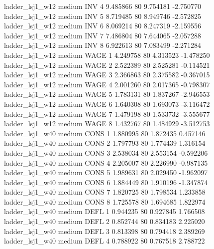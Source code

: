     ladder_lsj1_w12     medium      INV                 4  9.485866 80       9.754181          -2.750770
    ladder_lsj1_w12     medium      INV                 5  8.719485 80       8.949746          -2.572825
    ladder_lsj1_w12     medium      INV                 6  8.069214 80       8.247319          -2.159556
    ladder_lsj1_w12     medium      INV                 7  7.486804 80       7.644065          -2.057288
    ladder_lsj1_w12     medium      INV                 8  6.922613 80       7.083499          -2.271284
    ladder_lsj1_w12     medium     WAGE                 1  4.249758 80       4.313523          -1.478250
    ladder_lsj1_w12     medium     WAGE                 2  2.522389 80       2.525281          -0.114521
    ladder_lsj1_w12     medium     WAGE                 3  2.366863 80       2.375582          -0.367015
    ladder_lsj1_w12     medium     WAGE                 4  2.001260 80       2.017365          -0.798307
    ladder_lsj1_w12     medium     WAGE                 5  1.783131 80       1.837267          -2.946553
    ladder_lsj1_w12     medium     WAGE                 6  1.640308 80       1.693073          -3.116472
    ladder_lsj1_w12     medium     WAGE                 7  1.479198 80       1.533732          -3.555677
    ladder_lsj1_w12     medium     WAGE                 8  1.432767 80       1.484929          -3.512753
    ladder_lsj1_w40     medium     CONS                 1  1.880995 80       1.872435           0.457146
    ladder_lsj1_w40     medium     CONS                 2  1.797793 80       1.774439           1.316154
    ladder_lsj1_w40     medium     CONS                 3  2.538034 80       2.553154          -0.592206
    ladder_lsj1_w40     medium     CONS                 4  2.205007 80       2.226990          -0.987135
    ladder_lsj1_w40     medium     CONS                 5  1.989631 80       2.029450          -1.962097
    ladder_lsj1_w40     medium     CONS                 6  1.884449 80       1.910196          -1.347874
    ladder_lsj1_w40     medium     CONS                 7  1.820725 80       1.798534           1.233858
    ladder_lsj1_w40     medium     CONS                 8  1.725578 80       1.694685           1.822974
    ladder_lsj1_w40     medium     DEFL                 1  0.944235 80       0.927845           1.766508
    ladder_lsj1_w40     medium     DEFL                 2  0.852744 80       0.834183           2.225020
    ladder_lsj1_w40     medium     DEFL                 3  0.813398 80       0.794418           2.389269
    ladder_lsj1_w40     medium     DEFL                 4  0.788922 80       0.767518           2.788722
